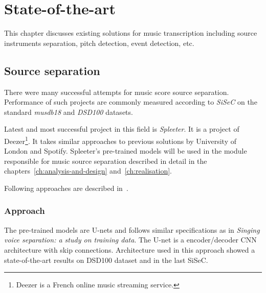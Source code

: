 \chapter{State-of-the-art}\label{ch:state-of-the-art}

This chapter discusses existing solutions for music transcription including source instruments separation, pitch
detection, event detection, etc.

\section{Source separation}\label{sec:source-separation}

There were many successful attempts for music score source separation\cite{spleeter2019,singing-voice-separation,singing-voice-separation-article}.
Performance of such projects are commonly measured according to \textit{\ac{SiSeC}}\cite{stter20182018}
on the standard \textit{musdb18} and \textit{DSD100} datasets.

Latest and most successful project in this field is \textit{Spleeter}\cite{spleeter2019}. It is a project of
Deezer\footnote{Deezer is a French online music streaming service.}. It takes similar approaches to previous solutions
by University of London and Spotify\cite{singing-voice-separation}. Spleeter's pre-trained models will be used in the
module responsible for music source separation described in detail in the chapters~\ref{ch:analysis-and-design} and~\ref{ch:realisation}.

Following approaches are described in~\cite{spleeter2019,singing-voice-separation,singing-voice-separation-article}.

\subsection{Approach}\label{subsec:music-source-separation:approach}
The pre-trained models are U-nets\cite{singing-voice-separation} and follows similar specifications as in
\textit{Singing voice separation: a study on training data}\cite{singing-voice-separation-article}. The U-net is a
encoder/decoder \ac{CNN} architecture with skip connections\cite{spleeter2019}. Architecture used in this approach
showed a state-of-the-art results on DSD100 dataset\cite{singing-voice-separation} and in the last \ac{SiSeC}\cite{SiSEC16}.

